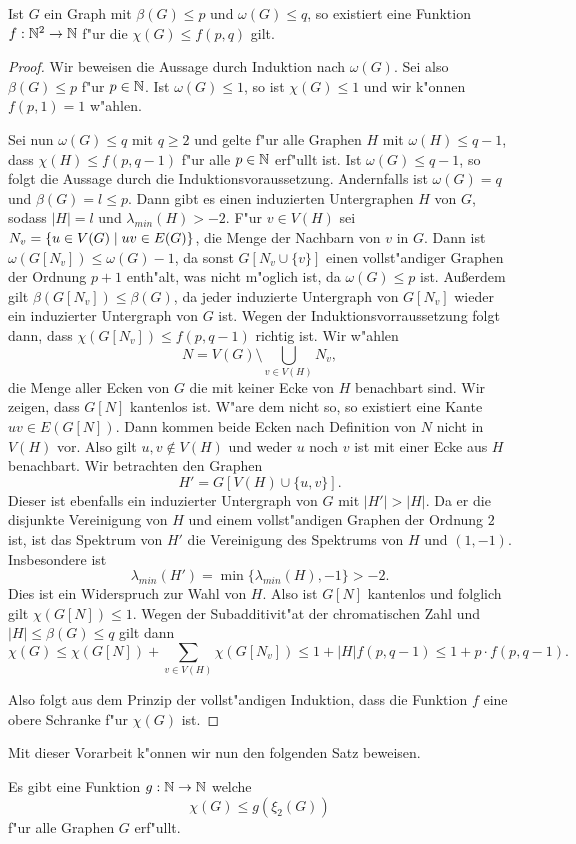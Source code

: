   \begin{lemma}
    Ist $G$ ein Graph mit $\beta(G) \leq p$ und $\omega(G) \leq q$, so existiert eine Funktion $f:{\mathbb{N}} ^{2} \to {\mathbb{N}}$ f"ur die $\chi(G) \leq f(p,q) $ gilt. 
    \label{lem:funktionxilemma}
  \end{lemma}
  \begin{proof}
    Wir beweisen die Aussage durch Induktion nach $\omega(G)$. Sei also $\beta(G) \leq p$ f"ur $p\in {\mathbb{N}}$. Ist $\omega(G) \leq 1$, so ist $\chi(G) \leq 1$ und wir k"onnen $f(p,1) = 1$ w"ahlen.

    Sei nun $\omega(G) \leq q$ mit $q \geq 2$ und gelte f"ur alle Graphen $H$ mit $\omega(H) \leq q-1$, dass $\chi(H) \leq f(p,q-1)$ f"ur alle $p \in {\mathbb{N}}$ erf"ullt ist.
    Ist $\omega(G) \leq q-1$, so folgt die Aussage durch die Induktionsvoraussetzung. Andernfalls ist $\omega(G) = q$ und $\beta(G) = l \leq p$. Dann gibt es einen induzierten Untergraphen $H$ von $G$, sodass $|H|=l$ und $\lambda_{min}(H)> -2$. F"ur $v\in V(H)$ sei $N_v = \{u\in V(G) \;|\; uv\in E(G) \}$, die Menge der Nachbarn von
    $v$ in $G$. Dann ist $\omega(G[N_v]) \leq \omega(G) -1 $, da sonst $G[N_v\cup \{v\}]$ einen vollst"andiger Graphen der Ordnung $p+1$ enth"alt, was nicht m"oglich ist, da $\omega(G) \leq p$ ist. Au{\ss}erdem gilt $\beta(G[N_v]) \leq \beta(G)$, da jeder induzierte Untergraph von $G[N_v]$ wieder ein induzierter Untergraph von $G$ ist. Wegen der Induktionsvorraussetzung folgt dann, dass $\chi(G[N_v]) \leq f(p,q-1)$ richtig ist. 
    Wir w"ahlen $$N = V(G) \setminus \bigcup\limits_{v\in V(H)} N_v,$$ die Menge aller Ecken von $G$ die mit keiner Ecke von $H$ benachbart sind. Wir zeigen, dass $G[N]$ kantenlos ist. W"are dem nicht so, so existiert eine Kante $uv\in E(G[N])$. 
    Dann kommen beide Ecken nach Definition von $N$ nicht in $V(H)$ vor. 
    Also gilt $u,v\notin V(H)$ und weder $u$ noch $v$ ist mit einer Ecke aus $H$ benachbart. Wir betrachten den Graphen $$H' = G[V(H) \cup \{u,v\}].$$ Dieser ist ebenfalls ein induzierter Untergraph von $G$ mit $|H'| > |H|$. Da er die disjunkte Vereinigung von $H$ und einem vollst"andigen Graphen der Ordnung $2$ ist, ist das Spektrum von $H'$ die Vereinigung des Spektrums von $H$ und $(1,-1)$. Insbesondere ist $$\lambda_{min}(H') = \min \{\lambda_{min}(H), -1\} > -2.$$ 
    Dies ist ein Widerspruch zur Wahl von $H$. Also ist $G[N]$ kantenlos und folglich gilt $\chi(G[N]) \leq 1$. 
    Wegen der Subadditivit"at der chromatischen Zahl und $|H| \leq \beta(G) \leq q$ gilt dann $$\chi(G) \leq \chi(G[N]) + \sum\limits_{v\in V(H)}\chi(G[N_v]) \leq 1 + |H|f(p,q-1)  \leq 1+p\cdot f(p,q-1).$$

    Also folgt aus dem Prinzip der vollst"andigen Induktion, dass die Funktion $f$ eine obere Schranke f"ur $\chi(G)$ ist.
  \end{proof}
  Mit dieser Vorarbeit k"onnen wir nun den folgenden Satz beweisen.
  \begin{theorem}
    Es gibt eine Funktion $g:{\mathbb{N}} \to {\mathbb{N}}$ welche $$\chi(G) \leq g(\xi_{2}(G))$$ f"ur alle Graphen $G$ erf"ullt. 
    \label{thm:funktionxi}
  \end{theorem}

